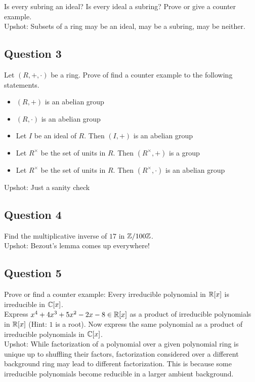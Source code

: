 \documentclass[a4paper]{article}
\begin{document}
Is every subring an ideal? Is every ideal a subring? Prove or give a counter example. \\

Upshot: Subsets of a ring may be an ideal, may be a subring, may be neither. 

\subsection*{Question 3}
Let $(R,+,\cdot)$ be a ring. Prove of find a counter example to the following statements. 
\begin{itemize}
\item $(R,+)$ is an abelian group
\item $(R,\cdot)$ is an abelian group
\item Let $I$ be an ideal of $R$. Then $(I,+)$ is an abelian group
\item Let $R^\times$ be the set of units in $R$. Then $(R^\times,+)$ is a group
\item Let $R^\times$ be the set of units in $R$. Then $(R^\times,\cdot)$ is an abelian group
\end{itemize}

Upshot: Just a sanity check

\subsection*{Question 4}
Find the multiplicative inverse of $17$ in $\mathbb{Z}/100\mathbb{Z}$. \\

Upshot: Bezout's lemma comes up everywhere!

\subsection*{Question 5}
Prove or find a counter example: Every irreducible polynomial in $\mathbb{R}[x]$ is irreducible in $\mathbb{C}[x]$. \\

Express $x^4+4x^3+5x^2-2x-8\in\mathbb{R}[x]$ as a product of irreducible polynomials in $\mathbb{R}[x]$ (Hint: $1$ is a root). Now express the same polynomial as a product of irreducible polynomials in $\mathbb{C}[x]$. \\

Upshot: While factorization of a polynomial over a given polynomial ring is unique up to shuffling their factors, factorization considered over a different background ring may lead to different factorization. This is because some irreducible polynomials become reducible in a larger ambient background. 
\end{document}
